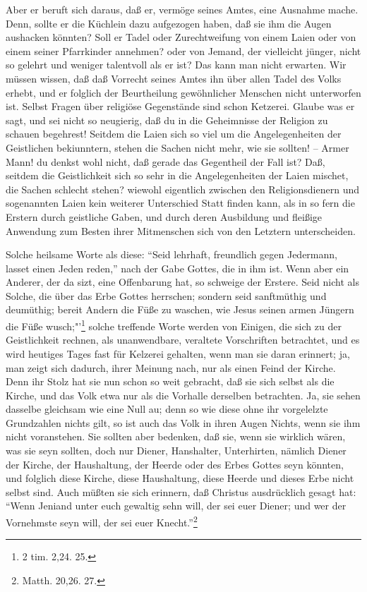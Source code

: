 Aber er beruft sich daraus, daß er, vermöge seines Amtes, eine Ausnahme mache.
Denn, sollte er die Küchlein dazu aufgezogen haben, daß sie ihm die Augen
aushacken könnten? Soll er Tadel oder Zurechtweifung von einem Laien oder von
einem seiner Pfarrkinder annehmen? oder von Jemand, der vielleicht jünger, nicht
so gelehrt und weniger talentvoll als er ist? Das kann man nicht erwarten. Wir
müssen wissen, daß daß Vorrecht seines Amtes ihn über allen Tadel des Volks
erhebt, und er folglich der Beurtheilung gewöhnlicher Menschen nicht unterworfen
ist. Selbst Fragen über religiöse Gegenstände sind schon Ketzerei. Glaube was er
sagt, und sei nicht so neugierig, daß du in die Geheimnisse der Religion zu
schauen begehrest! Seitdem die Laien sich so viel um die Angelegenheiten der
Geistlichen bekiunntern, stehen die Sachen nicht mehr, wie sie sollten! -- Armer
Mann! du denkst wohl nicht, daß gerade das Gegentheil der Fall ist? Daß, seitdem
die Geistlichkeit sich so sehr in die Angelegenheiten der Laien mischet, die
Sachen schlecht stehen? wiewohl eigentlich zwischen den Religionsdienern und
sogenannten Laien kein weiterer Unterschied Statt finden kann, als in so fern
die Erstern durch geistliche Gaben, und durch deren Ausbildung und fleißige
Anwendung zum Besten ihrer Mitmenschen sich von den Letztern unterscheiden.

Solche heilsame Worte als diese: "`Seid lehrhaft, freundlich gegen Jedermann,
lasset einen Jeden reden,"' nach der Gabe Gottes, die in ihm ist. Wenn aber ein
Anderer, der da sizt, eine Offenbarung hat, so schweige der Erstere. Seid nicht
als Solche, die über das Erbe Gottes herrschen; sondern seid sanftmüthig und
deumüthig; bereit Andern die Füße zu waschen, wie Jesus seinen armen Jüngern die
Füße wusch;"'\footnote{2 tim. 2,24. 25.} solche treffende Worte werden von
Einigen, die sich zu der Geistlichkeit rechnen, als unanwendbare, veraltete
Vorschriften betrachtet, und es wird heutiges Tages fast für Kelzerei gehalten,
wenn man sie daran erinnert; ja, man zeigt sich dadurch, ihrer Meinung nach, nur
als einen Feind der Kirche. Denn ihr Stolz hat sie nun schon so weit gebracht,
daß sie sich selbst als die Kirche, und das Volk etwa nur als die Vorhalle
derselben betrachten. Ja, sie sehen dasselbe gleichsam wie eine Null au; denn so
wie diese ohne ihr vorgelelzte Grundzahlen nichts gilt, so ist auch das Volk in
ihren Augen Nichts, wenn sie ihm nicht voranstehen. Sie sollten aber bedenken,
daß sie, wenn sie wirklich wären, was sie seyn sollten, doch nur Diener,
Hanshalter, Unterhirten, nämlich Diener der Kirche, der Haushaltung, der Heerde
oder des Erbes Gottes seyn könnten, und folglich diese Kirche, diese
Haushaltung, diese Heerde und dieses Erbe nicht selbst sind. Auch müßten sie
sich erinnern, daß Christus ausdrücklich gesagt hat: "`Wenn Jeniand unter euch
gewaltig sehn will, der sei euer Diener; und wer der Vornehmste seyn will, der
sei euer Knecht."'\footnote{Matth. 20,26. 27.}

